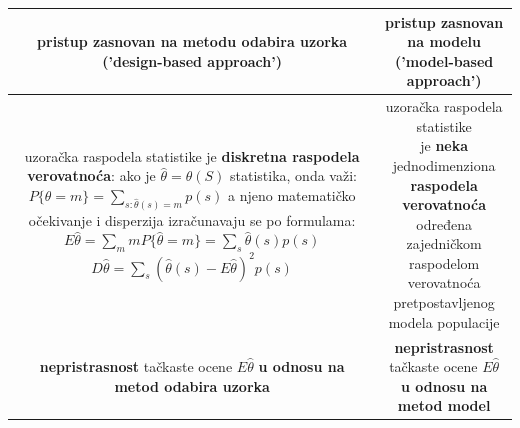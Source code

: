 \documentclass[10pt,a4paper,]{article}
\begin{document}
\begin{center}
\begin{tabular}{|c|c|}
\hline
\makecell{\textbf{pristup zasnovan na metodu odabira uzorka}
 \\ 
 \textbf{('design-based approach')}}
&
\makecell{\textbf{pristup zasnovan na modelu}
\\ \textbf{('model-based approach')}
}

\\
\hline
\makecell {
	uzoračka raspodela statistike je\\
	\textbf{diskretna raspodela verovatnoća}:\\
	ako je $\hat{\theta} = \hat{\theta}(S)$ statistika, onda važi: \\
	$P\{\hat{\theta} = m\}=\sum_{s:\hat{\theta}(s)=m}p(s)$\\
	a njeno matematičko očekivanje i disperzija \\ 
	izračunavaju se po formulama:\\
	$E\hat{\theta} = \sum_{m}mP\{\hat{\theta} = m\}
	= \sum_{s}\hat{\theta}(s)p(s)$ \\
	$D\hat{\theta} = \sum_{s}(\hat{\theta}(s) - E\hat{\theta})^2 p(s)$
}
&
\makecell {
 uzoračka raspodela statistike\\
 je \textbf{neka} jednodimenziona\\ 
 \textbf{raspodela verovatnoća} određena \\
 zajedničkom raspodelom verovatnoća\\
 pretpostavljenog modela populacije
}
\\
\hline
\makecell {
	\textbf{nepristrasnost} tačkaste ocene\\
	$E\hat{\theta}$ \textbf{u odnosu na metod odabira uzorka}
}
&
\makecell {
	\textbf{nepristrasnost} tačkaste ocene\\
	$E\hat{\theta}$ \textbf{u odnosu na metod model}
}\\
\hline

\end{tabular}
\end{center}
\end{document}
